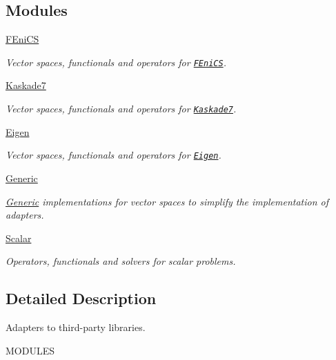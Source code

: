 \subsection*{Modules}
\begin{DoxyCompactItemize}
\item 
\hyperlink{group__FenicsGroup}{F\+Eni\+CS}
\begin{DoxyCompactList}\small\item\em Vector spaces, functionals and operators for \href{http://www.fenicsproject.org}{\tt F\+Eni\+CS}. \end{DoxyCompactList}\item 
\hyperlink{group__KaskadeGroup}{Kaskade7}
\begin{DoxyCompactList}\small\item\em Vector spaces, functionals and operators for \href{http://www.zib.de/projects/kaskade7-finite-element-toolbox}{\tt Kaskade7}. \end{DoxyCompactList}\item 
\hyperlink{group__EigenGroup}{Eigen}
\begin{DoxyCompactList}\small\item\em Vector spaces, functionals and operators for \href{http://eigen.tuxfamily.org}{\tt Eigen}. \end{DoxyCompactList}\item 
\hyperlink{group__GenericGroup}{Generic}
\begin{DoxyCompactList}\small\item\em \hyperlink{namespaceSpacy_1_1Generic}{Generic} implementations for vector spaces to simplify the implementation of adapters. \end{DoxyCompactList}\item 
\hyperlink{group__ScalarGroup}{Scalar}
\begin{DoxyCompactList}\small\item\em Operators, functionals and solvers for scalar problems. \end{DoxyCompactList}\end{DoxyCompactItemize}


\subsection{Detailed Description}
Adapters to third-\/party libraries. 

M\+O\+D\+U\+L\+ES 